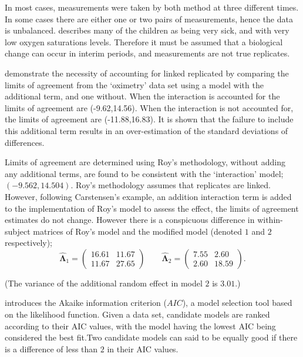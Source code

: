 \documentclass[MAIN.tex]{subfiles}
\begin{document}
	In most cases, measurements were taken by both method at three different times. In some cases there are either one or two pairs of measurements, hence the data is unbalanced. \citet{BXC2008} describes many of the children as being very sick, and with very low oxygen saturations levels. Therefore it must be assumed that a biological change can occur in interim periods, and measurements are not true replicates.
	
	\citet{BXC2008} demonstrate the necessity of accounting for linked replicated by comparing the limits of agreement from the `oximetry' data set using a model with the additional term, and one without. When the interaction is accounted for the limits of agreement are (-9.62,14.56). When the interaction is not accounted for, the limits of agreement are (-11.88,16.83). It is shown that the failure to include this additional term results in an over-estimation of the standard deviations of differences.
	
	Limits of agreement are determined using Roy's methodology, without adding any additional terms, are found to be consistent with the `interaction' model; $(-9.562, 14.504 )$. Roy's methodology assumes that replicates are linked. However, following Carstensen's example, an addition interaction term is added to the implementation of Roy's model to assess the effect, the limits of agreement estimates do not change. However there is a conspicuous difference in within-subject matrices of Roy's model and the modified model (denoted $1$ and $2$ respectively);
	\begin{equation}
	\hat{\boldsymbol{\Lambda}}_{1}= \left(\begin{array}{cc}
	16.61 &	11.67\\
	11.67 & 27.65 \end{array}\right) \qquad
	\boldsymbol{\hat{\Lambda}}_{2}= \left( \begin{array}{cc}
	7.55 & 2.60 \\
	2.60 & 18.59 \end{array} \right). 
	\end{equation}
	
	\noindent (The variance of the additional random effect in model $2$ is $3.01$.)
	
	\citet{akaike} introduces the Akaike information criterion ($AIC$), a model 
	selection tool based on the likelihood function. Given a data set, candidate models
	are ranked according to their AIC values, with the model having the lowest AIC being considered the best fit.Two candidate models can said to be equally good if there is a difference of less than $2$ in their AIC values.
	
\end{document}

